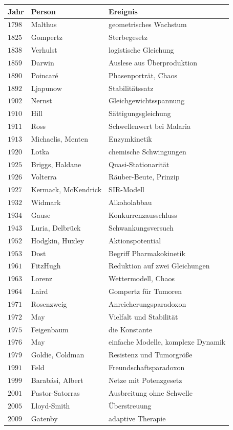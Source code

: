 \begin{merksatz}
\begin{center}
{\small
\renewcommand{\arraystretch}{1.36}
\begin{tabular}{@{}P{1.4cm}P{2.8cm}P{4.0cm}@{}}
\toprule
\textbf{Jahr} & \textbf{Person} & \textbf{Ereignis}\\
\midrule
$1798$ & Malthus & geometrisches Wachstum\\
$1825$ & Gompertz & Sterbegesetz\\
$1838$ & Verhulst & logistische Gleichung\\
$1859$ & Darwin & Auslese aus Überproduktion\\
$1890$ & Poincaré & Phasenporträt, Chaos\\
$1892$ & Ljapunow & Stabilitätssatz\\
$1902$ & Nernst & Gleichgewichtsspannung\\
$1910$ & Hill & Sättigungsgleichung\\
$1911$ & Ross & Schwellenwert bei Malaria\\
$1913$ & Michaelis, Menten & Enzymkinetik\\
$1920$ & Lotka & chemische Schwingungen\\
$1925$ & Briggs, Haldane & Quasi-Stationarität\\
$1926$ & Volterra & Räuber-Beute, Prinzip\\
$1927$ & Kermack, McKendrick & SIR-Modell\\
$1932$ & Widmark & Alkoholabbau\\
$1934$ & Gause & Konkurrenzausschluss\\
$1943$ & Luria, Delbrück & Schwankungsversuch\\
$1952$ & Hodgkin, Huxley & Aktionspotential\\
$1953$ & Dost & Begriff Pharmakokinetik\\
$1961$ & FitzHugh & Reduktion auf zwei Gleichungen\\
$1963$ & Lorenz & Wettermodell, Chaos\\
$1964$ & Laird & Gompertz für Tumoren\\
$1971$ & Rosenzweig & Anreicherungsparadoxon\\
$1972$ & May & Vielfalt und Stabilität\\
$1975$ & Feigenbaum & die Konstante\\
$1976$ & May & einfache Modelle, komplexe Dynamik\\
$1979$ & Goldie, Coldman & Resistenz und Tumorgröße\\
$1991$ & Feld & Freundschaftsparadoxon\\
$1999$ & Barabási, Albert & Netze mit Potenzgesetz\\
$2001$ & Pastor-Satorras & Ausbreitung ohne Schwelle\\
$2005$ & Lloyd-Smith & Überstreuung\\
$2009$ & Gatenby & adaptive Therapie\\
\bottomrule
\end{tabular}}
\end{center}
\end{merksatz}

